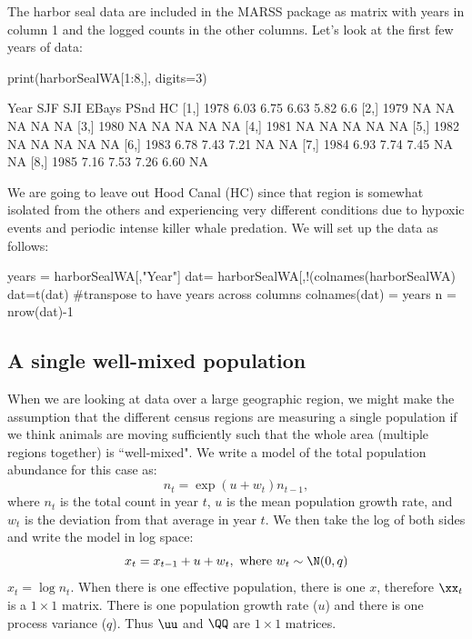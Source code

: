 The harbor seal data are included in the MARSS package as matrix with years in column 1 and the logged counts in the other columns. Let's look at the first few years of data:
\begin{Schunk}
\begin{Sinput}
 print(harborSealWA[1:8,], digits=3)
\end{Sinput}
\begin{Soutput}
     Year  SJF  SJI EBays PSnd  HC
[1,] 1978 6.03 6.75  6.63 5.82 6.6
[2,] 1979   NA   NA    NA   NA  NA
[3,] 1980   NA   NA    NA   NA  NA
[4,] 1981   NA   NA    NA   NA  NA
[5,] 1982   NA   NA    NA   NA  NA
[6,] 1983 6.78 7.43  7.21   NA  NA
[7,] 1984 6.93 7.74  7.45   NA  NA
[8,] 1985 7.16 7.53  7.26 6.60  NA
\end{Soutput}
\end{Schunk}
We are going to leave out Hood Canal (HC) since that region is somewhat isolated from the others and experiencing very different conditions due to hypoxic events and periodic intense killer whale predation.  We will set up the data as follows:
\begin{Schunk}
\begin{Sinput}
 years = harborSealWA[,"Year"]
 dat= harborSealWA[,!(colnames(harborSealWA) %
 dat=t(dat) #transpose to have years across columns
 colnames(dat) = years
 n = nrow(dat)-1
\end{Sinput}
\end{Schunk}


\subsection{A single well-mixed population}
When we are looking at data over a large geographic region, we might make the assumption that the different census regions are measuring a single population if we think animals are moving sufficiently such that the whole area (multiple regions together) is ``well-mixed".  We write a model of the total  population abundance for this case as:
\begin{equation}
n_t = \exp(u + w_t) n_{t-1},
\label{eq:expstoc}\end{equation}
where $n_t$ is the total count in year $t$, $u$ is the mean population growth rate, and $w_t$ is the deviation from that average in year $t$. 
We then take the log of both sides and write the model in log space:
\begin{equation}
x_t = x_{t-1} + u + w_t, \textrm{ where } w_t \sim \N(0,q)
\label{eq:seg}
\end{equation}
$x_t=\log{n_t}$. When there is one effective population, there is one $x$, therefore $\xx_t$ is a $1 \times 1$ matrix.  There is one population growth rate ($u$) and there is one process variance ($q$).  Thus $\uu$ and $\QQ$ are $1 \times 1$ matrices.   

